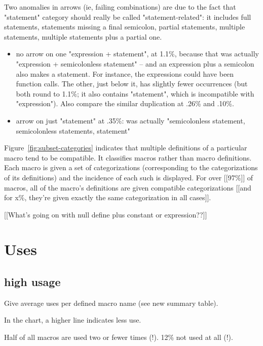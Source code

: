 \documentclass[10pt]{article}
\begin{document}
Two anomalies in arrows (ie, failing combinations) are due to the fact that
"statement" category should really be called "statement-related": it
includes full statements, statements missing a final semicolon, partial
statements, multiple statements, multiple statements plus a partial one.
\begin{itemize}
\item
  no arrow on one "expression + statement", at 1.1\%, because that was
  actually "expression + semicolonless statement" -- and an expression plus
  a semicolon also makes a statement.  For instance, the expressions could
  have been function calls.  The other, just below it, has slightly fewer
  occurrences (but both round to 1.1\%; it also contains "statement", which
  is incompatible with "expression").  Also compare the similar duplication
  at .26\% and .10\%.
\item
  arrow on just "statement" at .35\%: was actually "semicolonless
  statement, semicolonless statements, statement"
\end{itemize}





        Figure~\ref{fig:subset-categories} indicates that multiple definitions of a
        particular macro tend to be compatible.  It classifies macros rather than
        macro definitions.  Each macro is
        given a set of categorizations (corresponding to the categorizations of its
        definitions) and the incidence of each such is displayed.  For over [[97\%]] of
        macros, all of the macro's definitions are given compatible
        categorizations [[and for x\%, they're given exactly the same
        categorization in all cases]].

        [[What's going on with null define plus constant or expression??]]

\section{Uses}

\subsection{high usage}

        Give average uses per defined macro name (see new summary table).

        In the chart, a higher line indicates less use.

        Half of all macros are used two or fewer times (!).  12\% not used
          at all (!).
\end{document}
